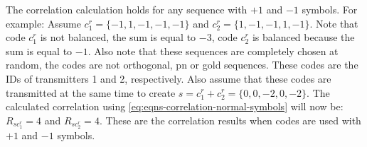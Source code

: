 %


The correlation calculation holds for any sequence with $+1$ and $-1$ symbols.
For example: Assume $c^r_1 = \{ -1, 1, -1, -1, -1 \}$ and $c^r_2 = \{ 1, -1, -1, 1, -1 \}$.
Note that code $c^r_1$ is not balanced, the sum is equal to $-3$, code $c^r_2$ is balanced because the sum is equal to $-1$.
Also note that these sequences are completely chosen at random, the codes are not orthogonal, pn or gold sequences.
These codes are the IDs of transmitters 1 and 2, respectively.
Also assume that these codes are transmitted at the same time to create $s = c^r_1 + c^r_2 = \{ 0, 0, -2, 0, -2 \}$.
The calculated correlation using \autoref{eq:eqns-correlation-normal-symbols} will now be: $R_{sc^r_{1}} = 4$ and $R_{sc^r_{2}} = 4$.
These are the correlation results when codes are used with $+1$ and $-1$ symbols.


